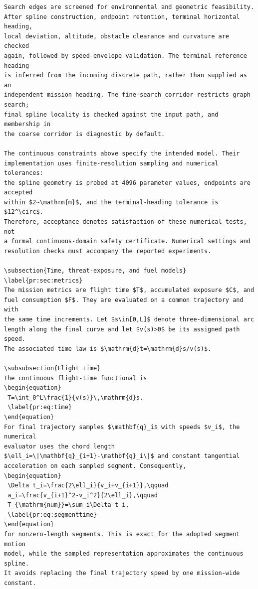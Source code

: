 \documentclass[12pt]{article}
\begin{document}
\begin{verbatim}
Search edges are screened for environmental and geometric feasibility.
After spline construction, endpoint retention, terminal horizontal heading,
local deviation, altitude, obstacle clearance and curvature are checked
again, followed by speed-envelope validation. The terminal reference heading
is inferred from the incoming discrete path, rather than supplied as an
independent mission heading. The fine-search corridor restricts graph search;
final spline locality is checked against the input path, and membership in
the coarse corridor is diagnostic by default.

The continuous constraints above specify the intended model. Their
implementation uses finite-resolution sampling and numerical tolerances:
the spline geometry is probed at 4096 parameter values, endpoints are accepted
within $2~\mathrm{m}$, and the terminal-heading tolerance is $12^\circ$.
Therefore, acceptance denotes satisfaction of these numerical tests, not
a formal continuous-domain safety certificate. Numerical settings and
resolution checks must accompany the reported experiments.

\subsection{Time, threat-exposure, and fuel models}
\label{pr:sec:metrics}
The mission metrics are flight time $T$, accumulated exposure $C$, and
fuel consumption $F$. They are evaluated on a common trajectory and with
the same time increments. Let $s\in[0,L]$ denote three-dimensional arc
length along the final curve and let $v(s)>0$ be its assigned path speed.
The associated time law is $\mathrm{d}t=\mathrm{d}s/v(s)$.

\subsubsection{Flight time}
The continuous flight-time functional is
\begin{equation}
 T=\int_0^L\frac{1}{v(s)}\,\mathrm{d}s.
 \label{pr:eq:time}
\end{equation}
For final trajectory samples $\mathbf{q}_i$ with speeds $v_i$, the numerical
evaluator uses the chord length
$\ell_i=\|\mathbf{q}_{i+1}-\mathbf{q}_i\|$ and constant tangential
acceleration on each sampled segment. Consequently,
\begin{equation}
 \Delta t_i=\frac{2\ell_i}{v_i+v_{i+1}},\qquad
 a_i=\frac{v_{i+1}^2-v_i^2}{2\ell_i},\qquad
 T_{\mathrm{num}}=\sum_i\Delta t_i,
 \label{pr:eq:segmenttime}
\end{equation}
for nonzero-length segments. This is exact for the adopted segment motion
model, while the sampled representation approximates the continuous spline.
It avoids replacing the final trajectory speed by one mission-wide constant.


\end{verbatim}
\end{document}
